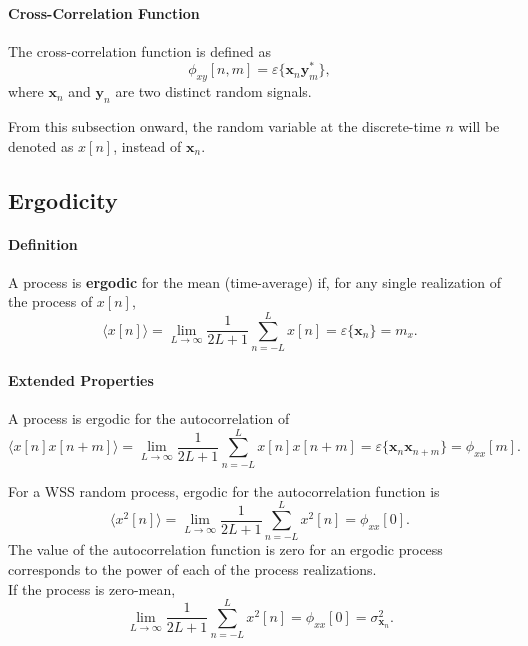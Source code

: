 \paragraph{Cross-Correlation Function} The cross-correlation function is defined as 
\[
    \phi_{xy} [n,m] = \varepsilon\{\mathbf{x}_n \mathbf{y}_m^*\},
\]
where $\mathbf{x}_n$ and $\mathbf{y}_n$ are two distinct random signals.

\begin{mdframed}[frametitle={Chnage in notation}, nobreak=false]
    From this subsection onward, the random variable at the discrete-time $n$ will be denoted as $x[n]$, instead of $\mathbf{x}_n$.
\end{mdframed}
\subsection{Ergodicity}
\paragraph{Definition}  A process is \textbf{ergodic} for the mean (time-average) if, for any single realization of the process of $x[n]$,
\[
    \langle x[n] \rangle = \lim_{L\to \infty} \frac{1}{2L+1} \sum_{n=-L}^{L} x[n] = \varepsilon\{\mathbf{x}_n\} = m_{x}.
\]

\paragraph{Extended Properties} A process is ergodic for the autocorrelation of
\[
    \langle x[n] x[n+m] \rangle = \lim_{L\to\infty} \frac{1}{2L+1} \sum_{n=-L}^{L} x[n] x[n+m] = \varepsilon\{\mathbf{x}_{n}\mathbf{x}_{n+m}\} = \phi_{xx}[m].
\]

For a WSS random process, ergodic for the autocorrelation function is
\[
    \langle x^2[n] \rangle = \lim_{L\to\infty} \frac{1}{2L+1} \sum_{n=-L}^{L} x^2[n] = \phi_{xx}[0].
\]
The value of the autocorrelation function is zero for an ergodic process corresponds to the power of each of the process realizations.\\

If the process is zero-mean, 
\[
    \lim_{L\to\infty} \frac{1}{2L+1}\sum_{n=-L}^{L} x^2[n] = \phi_{xx}[0] = \sigma_{\mathbf{x}_n}^2.
\]

